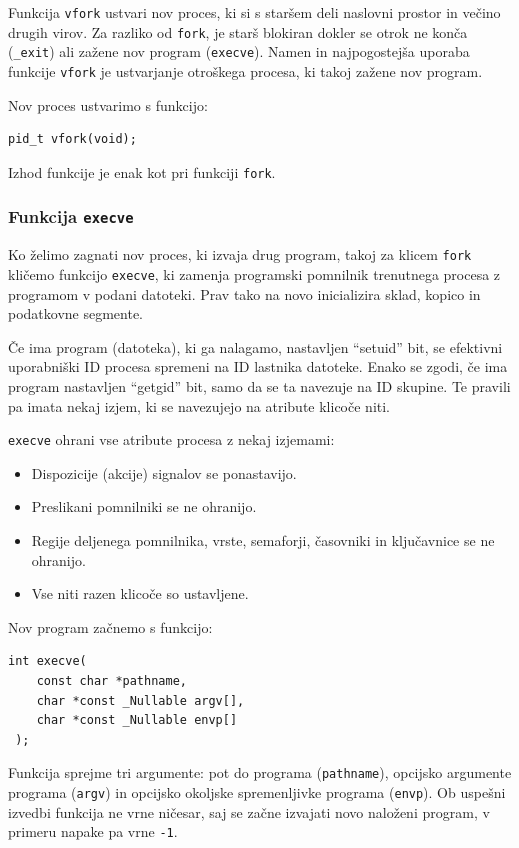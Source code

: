 \documentclass[a4paper,12pt,openright]{book}
\begin{document}
Funkcija \texttt{vfork} ustvari nov proces, ki si s staršem deli naslovni prostor in večino drugih virov.
Za razliko od \texttt{fork}, je starš blokiran dokler se otrok ne konča (\texttt{\_exit}) ali zažene nov program (\texttt{execve}).
Namen in najpogostejša uporaba funkcije \texttt{vfork} je ustvarjanje otroškega procesa, ki takoj zažene nov program.

Nov proces ustvarimo s funkcijo:
\begin{lstlisting}[style=func]
 pid_t vfork(void);
\end{lstlisting}

Izhod funkcije je enak kot pri funkciji \texttt{fork}.

\subsubsection{Funkcija \texttt{execve}}

Ko želimo zagnati nov proces, ki izvaja drug program, takoj za klicem \texttt{fork} kličemo funkcijo \texttt{execve}, ki zamenja programski pomnilnik trenutnega procesa z programom v podani datoteki.
Prav tako na novo inicializira sklad, kopico in podatkovne segmente.

Če ima program (datoteka), ki ga nalagamo, nastavljen ``setuid'' bit, se efektivni uporabniški ID procesa spremeni na ID lastnika datoteke.
Enako se zgodi, če ima program nastavljen ``getgid'' bit, samo da se ta navezuje na ID skupine.
Te pravili pa imata nekaj izjem, ki se navezujejo na atribute klicoče niti.

\texttt{execve} ohrani vse atribute procesa z nekaj izjemami:
\begin{itemize}
	\item Dispozicije (akcije) signalov se ponastavijo.
	\item Preslikani pomnilniki se ne ohranijo.
	\item Regije deljenega pomnilnika, vrste, semaforji, časovniki in ključavnice se ne ohranijo.
	\item Vse niti razen klicoče so ustavljene.
\end{itemize}

Nov program začnemo s funkcijo:
\begin{lstlisting}[style=func]
 int execve(
	const char *pathname,
	char *const _Nullable argv[],
	char *const _Nullable envp[]
 );
\end{lstlisting}

Funkcija sprejme tri argumente: pot do programa (\texttt{pathname}), opcijsko argumente programa (\texttt{argv}) in opcijsko okoljske spremenljivke programa (\texttt{envp}).
Ob uspešni izvedbi funkcija ne vrne ničesar, saj se začne izvajati novo naloženi program, v primeru napake pa vrne \texttt{-1}.
\end{document}
